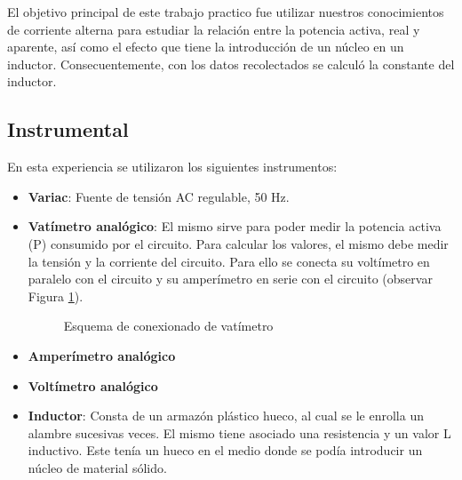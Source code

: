 \documentclass{article}
\begin{document}
        El objetivo principal de este trabajo practico fue utilizar nuestros conocimientos de corriente alterna para estudiar la relación entre la potencia activa, real y aparente, así como el efecto que tiene la introducción de un núcleo en un inductor.
        Consecuentemente, con los datos recolectados se calculó la constante del inductor.

        \subsection{Instrumental}

        En esta experiencia se utilizaron los siguientes instrumentos:

        \begin{itemize}
            \renewcommand{\labelitemi}{$\bullet$}
            \item {\bfseries Variac}: Fuente de tensión AC regulable, 50 Hz.
            \item {\bfseries Vatímetro analógico}: El mismo sirve para poder medir la potencia activa (P) consumido por el circuito.
                    Para calcular los valores, el mismo debe medir la tensión y la corriente del circuito. Para ello se conecta su voltímetro en paralelo con el circuito y su amperímetro en serie con el circuito (observar Figura \ref{fig:vatimetro}). \par

                    \begin{figure}[h!] %
                        \centering
                        \caption{Esquema de conexionado de vatímetro}
                        \label{fig:vatimetro}
                    \end{figure}
            \item {\bfseries Amperímetro analógico}
            \item {\bfseries Voltímetro analógico}
            \item {\bfseries Inductor}: Consta de un armazón plástico hueco, al cual se le enrolla un alambre sucesivas veces. El mismo tiene asociado una resistencia y un valor L inductivo. 
                Este tenía un hueco en el medio donde se podía introducir un núcleo de material sólido. 
        \end{itemize}
        
\end{document}
